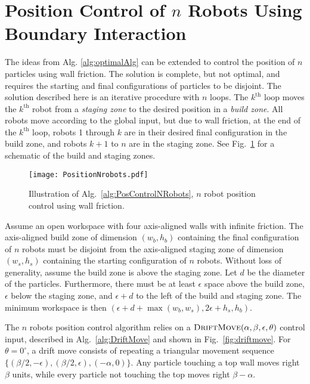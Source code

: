 

\section{Position Control of $n$ Robots Using Boundary Interaction}\label{sec:PostionControlnRobots}
The ideas from Alg. \ref{alg:optimalAlg}  can be extended to control the position of $n$ particles using wall friction.
The solution is complete, but not optimal, and requires the starting and final configurations of particles to be disjoint.
The solution described here is an iterative procedure with $n$ loops. 
 The $k^{\text{th}}$ loop moves the $k^{\text{th}}$ robot from a \emph{staging zone} to the desired position in a \emph{build zone}. 
  All robots move according to the global input, but due to wall friction, at the end of the $k^{\text{th}}$ loop, robots 1 through $k$ are in their desired final configuration in the build zone, and robots $k+1$ to $n$ are in the staging zone. 
   See Fig.~\ref{fig:simulationNrobot} for a schematic of the build and staging zones.

\begin{figure}
\begin{center}
	\texttt{[image: PositionNrobots.pdf]}
\end{center}
\vspace{-1em}
\caption{\label{fig:simulationNrobot}
Illustration of Alg.\ \ref{alg:PosControlNRobots}, $n$ robot position control  using wall friction.
}
\end{figure}

Assume an open workspace with four axis-aligned walls with infinite friction.
The axis-aligned build zone of dimension $(w_b, h_b)$ containing the final configuration of $n$ robots must be disjoint from the axis-aligned staging zone of dimension $(w_s, h_s)$  containing the starting configuration of $n$ robots.
 Without loss of generality, assume the build zone  is above the staging zone.  Let $d$ be the diameter of the particles.
Furthermore, there must be at least $\epsilon$ space above the build zone, $\epsilon$ below the staging zone, and $\epsilon + d$ to the left of the build and staging zone.  The minimum workspace is then $(\epsilon + d + \max(w_b,w_s), 2\epsilon + h_s,h_b)$.

The $n$ robots position control algorithm relies on a $\text{\sc DriftMove}(\alpha, \beta, \epsilon,\theta)$ control input, described in Alg.~\ref{alg:DriftMove} and shown in Fig.\  \ref{fig:driftmove}.
For $\theta = 0^\circ$, a drift move consists of repeating a triangular movement sequence $\{ (\beta/2,-\epsilon),(\beta/2,\epsilon),(-\alpha,0)\}$. 
 Any particle touching a top wall moves right $\beta$ units, while every particle not touching the top moves right $\beta-\alpha$.

